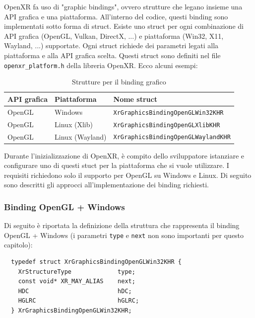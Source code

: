 \documentclass[twoside]{supsistudent}
\begin{document}
OpenXR fa uso di "graphic bindings", ovvero strutture che legano insieme una API grafica e una piattaforma. All'interno del codice, questi binding sono implementati sotto forma di struct. Esiste uno struct per ogni combinazione di API grafica (OpenGL, Vulkan, DirectX, ...) e piattaforma (Win32, X11, Wayland, ...) supportate. Ogni struct richiede dei parametri legati alla piattaforma e alla API grafica scelta. Questi struct sono definiti nel file \texttt{openxr\_platform.h} della libreria OpenXR. Ecco alcuni esempi:

\begin{table}[H]
  \caption{Strutture per il binding grafico}
  \begin{center}
    \begin{tabular}{ l l l }
      API grafica & Piattaforma & Nome struct \\
      \hline
      OpenGL      & Windows         & \texttt{XrGraphicsBindingOpenGLWin32KHR} \\
      OpenGL      & Linux (Xlib)    & \texttt{XrGraphicsBindingOpenGLXlibKHR} \\
      OpenGL      & Linux (Wayland) & \texttt{XrGraphicsBindingOpenGLWaylandKHR}
    \end{tabular}
  \end{center}
\end{table}

Durante l'inizializzazione di OpenXR, è compito dello sviluppatore istanziare e configurare uno di questi stuct per la piattaforma che si vuole utilizzare. I requisiti richiedono solo il supporto per OpenGL su Windows e Linux. Di seguito sono descritti gli approcci all'implementazione dei binding richiesti.

\subsubsection{Binding OpenGL + Windows}

Di seguito è riportata la definizione della struttura che rappresenta il binding OpenGL + Windows (i parametri \texttt{type} e \texttt{next} non sono importanti per questo capitolo):

\begin{verbatim}
  typedef struct XrGraphicsBindingOpenGLWin32KHR {
    XrStructureType             type;
    const void* XR_MAY_ALIAS    next;
    HDC                         hDC;
    HGLRC                       hGLRC;
  } XrGraphicsBindingOpenGLWin32KHR;
\end{verbatim}
\end{document}
